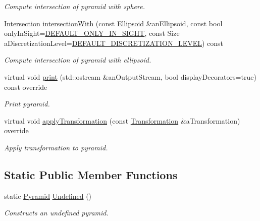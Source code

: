 \begin{DoxyCompactItemize}
\begin{DoxyCompactList}\small\item\em Compute intersection of pyramid with sphere. \end{DoxyCompactList}\item 
\hyperlink{classostk_1_1math_1_1geom_1_1d3_1_1_intersection}{Intersection} \hyperlink{classostk_1_1math_1_1geom_1_1d3_1_1objects_1_1_pyramid_aedc018303c7b9788036bc9269fcc161f}{intersection\+With} (const \hyperlink{classostk_1_1math_1_1geom_1_1d3_1_1objects_1_1_ellipsoid}{Ellipsoid} \&an\+Ellipsoid, const bool only\+In\+Sight=\hyperlink{_sphere_8hpp_af424617f7c785f4835e2feba5a5640f2}{D\+E\+F\+A\+U\+L\+T\+\_\+\+O\+N\+L\+Y\+\_\+\+I\+N\+\_\+\+S\+I\+G\+HT}, const Size a\+Discretization\+Level=\hyperlink{_pyramid_8hpp_a3eb9931e85ba4c9718113211e549e91d}{D\+E\+F\+A\+U\+L\+T\+\_\+\+D\+I\+S\+C\+R\+E\+T\+I\+Z\+A\+T\+I\+O\+N\+\_\+\+L\+E\+V\+EL}) const
\begin{DoxyCompactList}\small\item\em Compute intersection of pyramid with ellipsoid. \end{DoxyCompactList}\item 
virtual void \hyperlink{classostk_1_1math_1_1geom_1_1d3_1_1objects_1_1_pyramid_ae308eee53a721c8c41463a1ec4842a2d}{print} (std\+::ostream \&an\+Output\+Stream, bool display\+Decorators=true) const override
\begin{DoxyCompactList}\small\item\em Print pyramid. \end{DoxyCompactList}\item 
virtual void \hyperlink{classostk_1_1math_1_1geom_1_1d3_1_1objects_1_1_pyramid_ab4f31049019c0ea4b87931adf4ba7c5d}{apply\+Transformation} (const \hyperlink{classostk_1_1math_1_1geom_1_1d3_1_1_transformation}{Transformation} \&a\+Transformation) override
\begin{DoxyCompactList}\small\item\em Apply transformation to pyramid. \end{DoxyCompactList}\end{DoxyCompactItemize}
\subsection*{Static Public Member Functions}
\begin{DoxyCompactItemize}
\item 
static \hyperlink{classostk_1_1math_1_1geom_1_1d3_1_1objects_1_1_pyramid}{Pyramid} \hyperlink{classostk_1_1math_1_1geom_1_1d3_1_1objects_1_1_pyramid_a1da403f46a6f5566358d74b633478135}{Undefined} ()
\begin{DoxyCompactList}\small\item\em Constructs an undefined pyramid. \end{DoxyCompactList}\end{DoxyCompactItemize}


